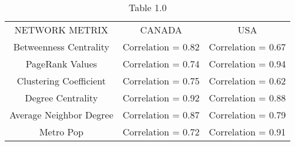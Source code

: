 \begin{table}[H]
    \centering
    \begin{tabular}{ccc}
         NETWORK METRIX& 
 CANADA& USA\\
         Betweenness Centrality&  Correlation = 0.82& Correlation = 0.67\\
         PageRank Values&  Correlation = 0.74& Correlation = 0.94\\
         Clustering Coefficient&  Correlation = 0.75& Correlation = 0.62\\
         Degree Centrality&  Correlation = 0.92& Correlation = 0.88\\
         Average Neighbor Degree&  Correlation = 0.87& Correlation = 0.79\\
         Metro Pop&  Correlation = 0.72& Correlation = 0.91\\
    \end{tabular}
    \caption{Table 1.0}
    \label{summary of the heatmap indication}
\end{table}

